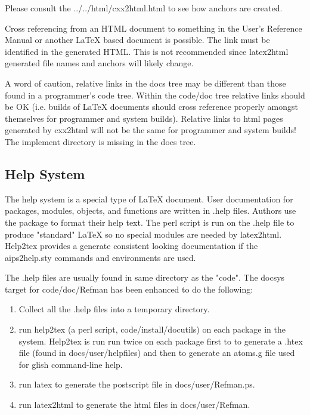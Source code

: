 Please consult the 
{../../html/cxx2html.html} to see how anchors are created.

Cross referencing from an HTML document to something in the User's
Reference Manual or another LaTeX based document is possible.
The link must be identified 
in the generated HTML.  This is not recommended since latex2html generated
file names and anchors will likely change.

A word of caution, relative links in the docs tree may be different than those
found in a programmer's code tree.  Within the code/doc tree relative links
should be OK (i.e. builds of LaTeX documents should cross reference properly
amongst themselves for programmer and system builds).  Relative links to html
pages generated by cxx2html will not be the same for programmer and system
builds!  The implement directory is missing in the docs tree.



\subsection{Help System}
The help system is a special type of LaTeX document.  User documentation for
packages, modules, objects, and functions are written in .help files.
Authors use the  package to format their
help text.  The perl script  is run on the
.help file to produce "standard" LaTeX so no special modules are needed by
latex2html.
Help2tex provides a generate consistent looking documentation if the
aips2help.sty commands and environments are used.

The .help files are usually found in same directory as the "code".
The docsys target for code/doc/Refman has been enhanced to do the following:
\begin{enumerate}
\item Collect all the .help files into a temporary directory.
\item run help2tex (a perl script, code/install/docutils) on each package in
the system. Help2tex is run run twice on each package first to to generate
a .htex file (found in docs/user/helpfiles) and then to generate an atoms.g
file used for glish command-line help.
\item run latex to generate the postscript file in docs/user/Refman.ps.
\item run latex2html to generate the html files in docs/user/Refman.
\end{enumerate}


